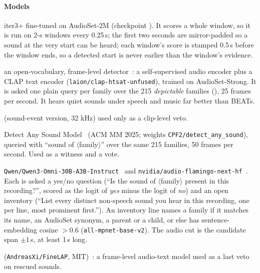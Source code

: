 \paragraph{Models}
\begin{description}[style=nextline]
  \item[BEATs] iter3+ fine-tuned on AudioSet-2M (checkpoint
        ). It scores a whole window, so it is run on 2-s
        windows every 0.25\,s; the first two seconds are mirror-padded so a sound at the very start can be heard; each
        window's score is stamped 0.5\,s before the window ends, so a detected start is never earlier than the window's evidence.
  \item[FlexSED] an open-vocabulary, frame-level detector~\cite{hai2025flexsed}: a self-supervised audio encoder plus
        a CLAP text encoder (\texttt{laion/clap-htsat-unfused}), trained on AudioSet-Strong. It is asked one plain
        query per family over the 215 \emph{depictable} families (), 25 frames
        per second. It hears quiet sounds under speech and music far better than BEATs.
  \item[PANNs CNN14] (sound-event version, 32 kHz) used only as a clip-level veto.
  \item[DASM] Detect Any Sound Model~\cite{cai2025dasm} (ACM MM 2025; weights \texttt{CPF2/detect\_any\_sound}), queried with ``sound of
        $\langle$family$\rangle$'' over the same 215 families, 50 frames per second. Used as a witness and a vote.
  \item[Listeners] \texttt{Qwen/Qwen3-Omni-30B-A3B-Instruct}~\cite{xu2025qwen3omni} and \texttt{nvidia/audio-flamingo-next-hf}~\cite{afnextcard}. Each is asked
        a yes/no question (``Is the sound of $\langle$family$\rangle$ present in this recording?'', scored as the logit of
        \emph{yes} minus the logit of \emph{no}) and an open inventory (``List every distinct non-speech sound you hear in
        this recording, one per line, most prominent first.''). An inventory line names a family if it matches its name,
        an AudioSet synonym, a parent or a child, or else has sentence-embedding cosine $>0.6$
        (\texttt{all-mpnet-base-v2}). The audio cut is the candidate span $\pm 1$\,s, at least 1\,s long.
  \item[FineLAP] (\texttt{AndreasXi/FineLAP}, MIT)~\cite{finelapcard}: a frame-level audio-text model used as a last veto on rescued sounds.
\end{description}


